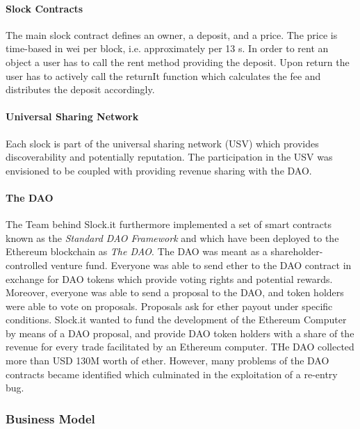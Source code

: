 \paragraph{Slock Contracts}

The main slock contract defines an owner, a deposit, and a price. The price is time-based in wei per block, i.e. approximately per 13 s. In order to rent an object a user has to call the rent method providing the deposit. Upon return the user has to actively call the returnIt function which calculates the fee and distributes the deposit accordingly. 

\paragraph{Universal Sharing Network}

Each slock is part of the universal sharing network (USV) which provides discoverability and potentially reputation. The participation in the USV was envisioned to be coupled with providing revenue sharing with the DAO. 

\paragraph{The DAO}

The Team behind Slock.it furthermore implemented a set of smart contracts known as the \emph{Standard DAO Framework} and which have been deployed to the Ethereum blockchain as \emph{The DAO}. The DAO was meant as a shareholder-controlled venture fund. Everyone was able to send ether to the DAO contract in exchange for DAO tokens which provide voting rights and potential rewards. Moreover, everyone was able to send a proposal to the DAO, and token holders were able to vote on proposals. Proposals ask for ether payout under specific conditions. Slock.it wanted to fund the development of the Ethereum Computer by means of a DAO proposal, and provide DAO token holders with a share of the revenue for every trade facilitated by an Ethereum computer. THe DAO collected more than USD 130M worth of ether. However, many problems of the DAO contracts became identified which culminated in the exploitation of a re-entry bug.

\subsubsection{Business Model}


